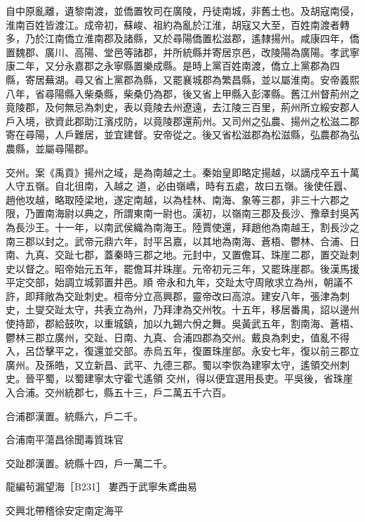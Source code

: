 \begin{pinyinscope}
 自中原亂離，遺黎南渡，並僑置牧司在廣陵，丹徒南城，非舊土也。及胡寇南侵，淮南百姓皆渡江。成帝初，蘇峻、祖約為亂於江淮，胡寇又大至，百姓南渡者轉多，乃於江南僑立淮南郡及諸縣，又於尋陽僑置松滋郡，遙隸揚州。咸康四年，僑置魏郡、廣川、高陽、堂邑等諸郡，并所統縣并寄居京邑，改陵陽為廣陽。孝武寧康二年，又分永嘉郡之永寧縣置樂成縣。是時上黨百姓南渡，僑立上黨郡為四
 縣，寄居蕪湖。尋又省上黨郡為縣，又罷襄城郡為繁昌縣，並以屬淮南。安帝義熙八年，省尋陽縣入柴桑縣，柴桑仍為郡，後又省上甲縣入彭澤縣。舊江州督荊州之竟陵郡，及何無忌為刺史，表以竟陵去州遼遠，去江陵三百里，荊州所立綏安郡人戶入境，欲資此郡助江濱戍防，以竟陵郡還荊州。又司州之弘農、揚州之松滋二郡寄在尋陽，人戶難居，並宜建督。安帝從之。後又省松滋郡為松滋縣，弘農郡為弘農縣，並屬尋陽郡。



 交州。案《禹貢》揚州之域，是為南越之土。秦始皇即略定揚越，以謫戍卒五十萬人守五嶺。自北徂南，入越之
 道，必由嶺嶠，時有五處，故曰五嶺。後使任囂、趙他攻越，略取陸梁地，遂定南越，以為桂林、南海、象等三郡，非三十六郡之限，乃置南海尉以典之，所謂東南一尉也。漢初，以嶺南三郡及長沙、豫章封吳芮為長沙王。十一年，以南武侯織為南海王。陸賈使還，拜趙他為南越王，割長沙之南三郡以封之。武帝元鼎六年，討平呂嘉，以其地為南海、蒼梧、鬱林、合浦、日南、九真、交趾七郡，蓋秦時三郡之地。元封中，又置儋耳、珠崖二郡，置交趾刺史以督之。昭帝始元五年，罷儋耳并珠崖。元帝初元三年，又罷珠崖郡。後漢馬援平定交部，始調立城郭置井邑。順
 帝永和九年，交趾太守周敞求立為州，朝議不許，即拜敞為交趾刺史。桓帝分立高興郡，靈帝改曰高涼。建安八年，張津為刺史，土燮交趾太守，共表立為州，乃拜津為交州牧。十五年，移居番禺，詔以邊州使持節，郡給鼓吹，以重城鎮，加以九錫六佾之舞。吳黃武五年，割南海、蒼梧、鬱林三郡立廣州，交趾、日南、九真、合浦四郡為交州。戴良為刺史，值亂不得入，呂岱擊平之，復還並交部。赤烏五年，復置珠崖部。永安七年，復以前三郡立廣州。及孫皓，又立新昌、武平、九德三郡。蜀以李恢為建寧太守，遙領交州刺史。晉平蜀，以蜀建寧太守霍弋遙領
 交州，得以便宜選用長吏。平吳後，省珠崖入合浦。交州統郡七，縣五十三，戶二萬五千六百。



 合浦郡漢置。統縣六，戶二千。



 合浦南平蕩昌徐聞毒質珠官



 交趾郡漢置。統縣十四，戶一萬二千。



 龍編茍漏望海［B231］婁西于武寧朱鳶曲易



 交興北帶稽徐安定南定海平




\end{pinyinscope}
